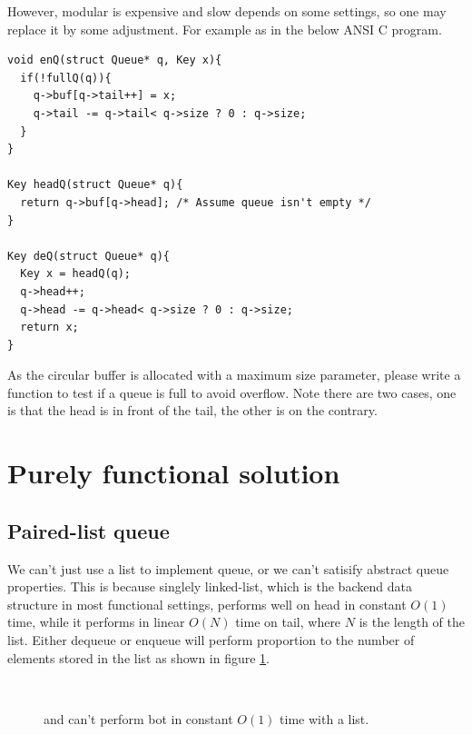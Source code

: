 \documentclass{article}
\begin{document}
However, modular is expensive and slow depends on some settings, so one
may replace it by some adjustment. For example as in the below ANSI C
program.

\begin{lstlisting}
void enQ(struct Queue* q, Key x){
  if(!fullQ(q)){
    q->buf[q->tail++] = x;
    q->tail -= q->tail< q->size ? 0 : q->size;
  }
}

Key headQ(struct Queue* q){
  return q->buf[q->head]; /* Assume queue isn't empty */
}

Key deQ(struct Queue* q){
  Key x = headQ(q);
  q->head++;
  q->head -= q->head< q->size ? 0 : q->size;
  return x;
}
\end{lstlisting}

\begin{Exercise}
As the circular buffer is allocated with a maximum size parameter, please
write a function to test if a queue is full to avoid overflow. Note
there are two cases, one is that the head is in front of the tail,
the other is on the contrary.
\end{Exercise}

\section{Purely functional solution}

\subsection{Paired-list queue}

We can't just use a list to implement queue, or we can't satisify abstract 
queue properties. This is because singlely linked-list, which
is the backend data structure in most functional settings, performs 
well on head in constant $O(1)$ time, while it performs in linear $O(N)$ 
time on tail, where $N$ is the length of the list. Either dequeue or enqueue
will perform proportion to the number of elements stored in the list
as shown in figure \ref{fig:linked-list-queue}.

\begin{figure}[htbp]
  \centering
   \\
  \caption{ and  can't perform bot in constant $O(1)$ time with a list.} \label{fig:linked-list-queue}
\end{figure}
\end{document}
